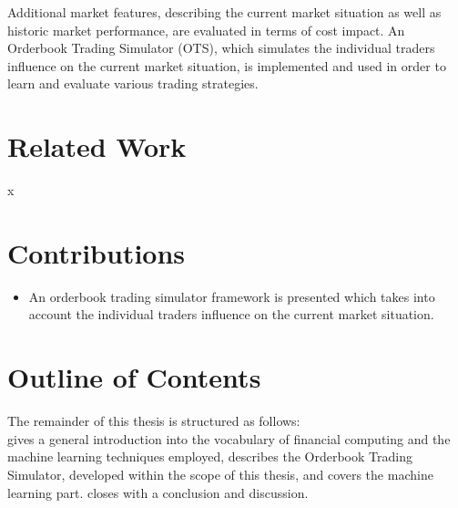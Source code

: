 Additional market features, describing the current market situation as well as historic market performance, are evaluated in terms of cost impact. An Orderbook Trading Simulator (OTS), which simulates the individual traders influence on the current market situation, is implemented and used in order to learn and evaluate various trading strategies.


\section{Related Work}
\label{sec:relatedwork}
x

\section{Contributions}
\label{sec:contributions}
\begin{itemize}
\item An orderbook trading simulator framework is presented which takes into account the individual traders influence on the current market situation.

\end{itemize}

\section{Outline of Contents}
\label{sec:outline}
The remainder of this thesis is structured as follows:\\
 gives a general introduction into the vocabulary of financial computing and the machine learning techniques employed,  describes the Orderbook Trading  Simulator, developed within the scope of this thesis, and  covers the machine learning part.  closes with a conclusion and discussion.


\clearpage{}